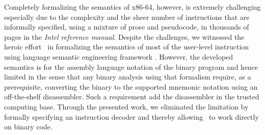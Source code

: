\documentclass[a4paper,UKenglish,cleveref, autoref]{lipics-v2019}
\begin{document}
Completely formalizing the semantics of x86-64, however, is extremely challenging especially due to the complexity and the sheer number of instructions that are informally specified, using a mixture of prose and pseudocode, in thousands of pages in the \emph{Intel reference manual}. 
Despite the challenges, we witnessed the heroic effort~\cite{Dasgupta:2019} in formalizing the semantics of most of the user-level instruction using language semantic engineering framework \K. However, the developed semantics is for the assembly language notation of the binary program and hence limited in the sense that any binary analysis using that formalism require, as a prerequisite, converting the binary to the supported mnemonic notation using an off-the-shelf disassembler. Such a requirement add the disassembler in the trusted computing base. Through the presented work, we eliminated the limitation by formally specifying an instruction decoder and thereby allowing~\cite{Dasgupta:2019} to work directly on binary code.






\end{document}
